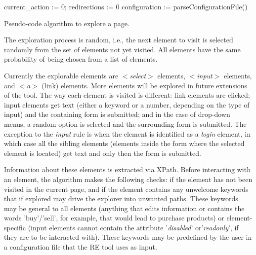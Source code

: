 \documentclass[10pt, conference, compsocconf]{IEEEtran}
\begin{document}
\begin{algorithm}[!htb]
  
  current\_action := 0; redirections := 0\;
  configuration := parseConfigurationFile()\;
  

\caption{Pseudo-code algorithm to explore a page.}\label{alg:seeker}
\end{algorithm}

The exploration process is random, i.e., the next element to visit is selected randomly from the set of elements not yet visited. All elements have the same probability of being chosen from a list of elements.

Currently the explorable elements are \textit{$<$select$>$} elements, \textit{$<$input$>$} elements, and \textit{$<$a$>$} (link) elements. More elements will be explored in future extensions of the tool. The way each element is visited is different: link elements are clicked; input elements get text (either a keyword or a number, depending on the type of input) and the containing form is submitted; and in the case of drop-down menus, a random option is selected and the surrounding form is submitted. The exception to the \textit{input} rule is when the element is identified as a \textit{login} element, in which case all the sibling elements (elements inside the form where the selected element is located) get text and only then the form is submitted.

Information about these elements is extracted via XPath.%
Before interacting with an element, the algorithm makes the following checks: if the element has not been visited in the current page, and if the element contains any unwelcome keywords that if explored may drive the explorer into unwanted paths. These keywords may be general to all elements (anything that edits information or contains the words 'buy'/'sell', for example, that would lead to purchase products) or element-specific (input elements cannot contain the attribute '\textit{disabled}' or'\textit{readonly}', if they are to be interacted with). These keywords may be predefined by the user in a configuration file that the RE tool uses as input.
\end{document}
